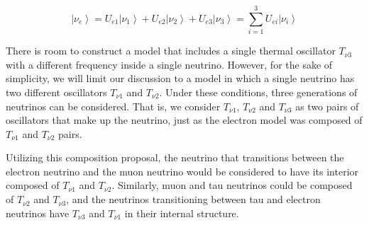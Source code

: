 \documentclass[%
 reprint,
 amsmath,amssymb,
 aps,
]{revtex4-1}
\numberwithin{equation}{section}%
\begin{document}
    \begin{equation}
        \left|\nu_e\right\rangle=U_{e 1}\left|\nu_1\right\rangle+U_{e 2}\left|\nu_2\right\rangle+U_{e 3}\left|\nu_3\right\rangle=\sum_{i=1}^3 U_{e i}\left|\nu_i\right\rangle
        \label{3genMass}
    \end{equation}




There is room to construct a model that includes a single thermal oscillator $T_{\nu \mathrm{3}}$ with a different frequency inside a single neutrino. However, for the sake of simplicity, we will limit our discussion to a model in which a single neutrino has two different oscillators $T_{\nu \mathrm{1}}$ and $T_{\nu \mathrm{2}}$. Under these conditions, three generations of neutrinos can be considered. That is, we consider $T_{\nu \mathrm{1}}$, $T_{\nu \mathrm{2}}$ and $T_{\nu \mathrm{3}}$ as two pairs of oscillators that make up the neutrino, just as the electron model was composed of $T_{\nu \mathrm{1}}$ and $T_{\nu \mathrm{2}}$ pairs.

Utilizing this composition proposal, the neutrino that transitions between the electron neutrino and the muon neutrino would be considered to have its interior composed of $T_{\nu \mathrm{1}}$ and $T_{\nu \mathrm{2}}$. Similarly, muon and tau neutrinos \cite{OPERA2015} could be composed of $T_{\nu \mathrm{2}}$ and $T_{\nu \mathrm{3}}$, and the neutrinos transitioning between tau and electron neutrinos have $T_{\nu \mathrm{3}}$ and $T_{\nu \mathrm{1}}$ in their internal structure.

\end{document}
